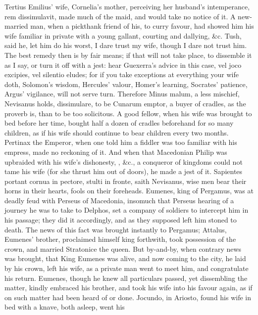 {Tertius Emilius' wife, Cornelia's mother, perceiving her husband's
intemperance, rem dissimulavit, made much of the maid, and would take
no notice of it. A new-married man, when a pickthank friend of his, to
curry favour, had showed him his wife familiar in private with a young
gallant, courting and dallying, \&c. Tush, said he, let him do his
worst, I dare trust my wife, though I dare not trust him. The best
remedy then is by fair means; if that will not take place, to dissemble
it as I say, or turn it off with a jest: hear Guexerra's advice in this
case, vel joco excipies, vel silentio eludes; for if you take
exceptions at everything your wife doth, Solomon's wisdom, Hercules'
valour, Homer's learning, Socrates' patience, Argus' vigilance, will
not serve turn. Therefore Minus malum, a less mischief, Nevisanus
holds, dissimulare, to be Cunarum emptor, a buyer of cradles, as
the proverb is, than to be too solicitous. A good fellow, when
his wife was brought to bed before her time, bought half a dozen of
cradles beforehand for so many children, as if his wife should continue
to bear children every two months. Pertinax the Emperor, when one
told him a fiddler was too familiar with his empress, made no reckoning
of it. And when that Macedonian Philip was upbraided with his wife's
dishonesty, , \&c., a
conqueror of kingdoms could not tame his wife (for she thrust him out
of doors), he made a jest of it. Sapientes portant cornua in pectore,
stulti in fronte, saith Nevisanus, wise men bear their horns in their
hearts, fools on their foreheads. Eumenes, king of Pergamus, was at
deadly feud with Perseus of Macedonia, insomuch that Perseus hearing of
a journey he was to take to Delphos, set a company of soldiers to
intercept him in his passage; they did it accordingly, and as they
supposed left him stoned to death. The news of this fact was brought
instantly to Pergamus; Attalus, Eumenes' brother, proclaimed himself
king forthwith, took possession of the crown, and married Stratonice
the queen. But by-and-by, when contrary news was brought, that King
Eumenes was alive, and now coming to the city, he laid by his crown,
left his wife, as a private man went to meet him, and congratulate his
return. Eumenes, though he knew all particulars passed, yet dissembling
the matter, kindly embraced his brother, and took his wife into his
favour again, as if on such matter had been heard of or done. Jocundo,
in Ariosto, found his wife in bed with a knave, both asleep, went his
}
